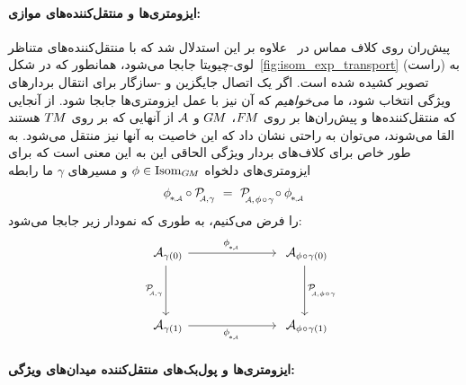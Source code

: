 \paragraph{ایزومتری‌ها و منتقل‌کننده‌های موازی:}
پیش‌ران روی کلاف مماس در~\cite{gallier2019diffgeom1} علاوه بر این استدلال شد که با منتقل‌کننده‌های متناظر لوی-چیویتا جابجا می‌شود، همانطور که در شکل~\ref{fig:isom_exp_transport} (راست) به تصویر کشیده شده است.
اگر یک اتصال جایگزین و -سازگار برای انتقال بردارهای ویژگی انتخاب شود، ما \emph{می‌خواهیم} که آن نیز با عمل ایزومتری‌ها جابجا شود.
از آنجایی که منتقل‌کننده‌ها و پیش‌ران‌ها بر روی $F\mkern-1.5muM$، $G\mkern-1.4muM$ و $\mathcal{A}$ از آنهایی که بر روی $T\mkern-1.5muM$ هستند القا می‌شوند، می‌توان به راحتی نشان داد که این خاصیت به آنها نیز منتقل می‌شود.
به طور خاص برای کلاف‌های بردار ویژگی الحاقی این به این معنی است که برای ایزومتری‌های دلخواه $\phi \in \operatorname{Isom}_{G\mkern-1.4muM}$ و مسیرهای $\gamma$ ما رابطه
\begin{align}\label{eq:transport_isom_commutation}
    \dphiA\! \circ \PAgamma
    \ =\ 
    \mathcal{P}_{\mkern-4mu\overset{}{\protect\scalebox{.6}{$\!\A$}, \mkern1.5mu\phi \mkern1.5mu\circ\mkern1.5mu \gamma}}\!
    \circ \dphiA
\end{align}
را فرض می‌کنیم، به طوری که نمودار زیر جابجا می‌شود:
\begin{equation}
\quad
\begin{tikzcd}[column sep=70pt, row sep=40, font=\normalsize]
    \A_{\gamma(0)}
        \arrow[r, "\dphiA"]
        \arrow[d, "\PAgamma"']
    &
    \A_{\phi \mkern1mu\circ\mkern1mu \gamma(0)}
        \arrow[d, "\mathcal{P}_{\mkern-4mu\overset{}{\protect\scalebox{.6}{$\!\A$}  \mkern-0mu,\phi \mkern1mu\circ\mkern1mu \gamma}}"]
    \\
    \A_{\gamma(1)}
        \arrow[r, "\dphiA"']
    &
    \A_{\phi \mkern1mu\circ\mkern1mu \gamma(1)}
\end{tikzcd}
\end{equation}






\paragraph{ایزومتری‌ها و پول‌بک‌های منتقل‌کننده میدان‌های ویژگی:}


